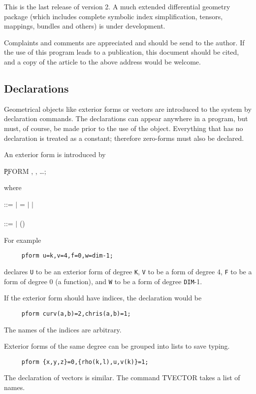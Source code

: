This is the last release of version 2. A much extended differential
geometry package (which includes complete symbolic index simplification,
tensors, mappings, bundles and others) is under development.

Complaints and comments are appreciated and should be send to the author.
If the use of this program leads to a publication, this document should
be cited, and a copy of the article to the above address would be
welcome.

\subsection{Declarations}

Geometrical objects like exterior forms or vectors are introduced to the
system by declaration commands.  The declarations can appear anywhere in
a program, but must, of course, be made prior to the use of the object.
Everything that has no declaration is treated as a constant; therefore
zero-forms must also be declared.

An exterior form is introduced by\label{PFORM} 
\hypertarget{command:PFORM}{}

\hspace*{2em} \k{PFORM} , , \ldots;

where
\begin{flushleft}
 ::=  $\mid$ = $\mid$   $\mid$ \\
 \\
 ::=  $\mid$ ()
\end{flushleft}

For example
\begin{verbatim}
     pform u=k,v=4,f=0,w=dim-1;
\end{verbatim}
declares \texttt{U} to be an exterior form of degree \texttt{K}, \texttt{V} to be a
form of degree 4, \texttt{F} to be a form of degree 0 (a function), and \texttt{W}
to be a form of degree \texttt{DIM}-1.

If the exterior form should have indices, the declaration would be
\begin{verbatim}
     pform curv(a,b)=2,chris(a,b)=1;
\end{verbatim}
The names of the indices are arbitrary.

Exterior forms of the same degree can be grouped into lists to save typing.
\begin{verbatim}
     pform {x,y,z}=0,{rho(k,l),u,v(k)}=1;
\end{verbatim}
The declaration of vectors is similar. The command \f{TVECTOR}\label{TVECTOR}
takes a list of names.  
\hypertarget{command:TVECTOR}{}

